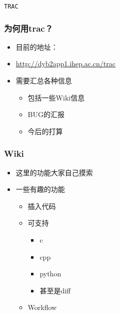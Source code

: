 
\begin{frame}
    \begin{center}
        \LARGE \tt{TRAC}
    \end{center}
\end{frame}

\begin{frame}
    \frametitle{为何用trac？}
    \begin{itemize}    
        \item 目前的地址：
        \item \url{http://dyb2app1.ihep.ac.cn/trac}
        \item 需要汇总各种信息
            \begin{itemize}
                \item 包括一些Wiki信息
                \item BUG的汇报
                \item 今后的打算
            \end{itemize}
    \end{itemize}
\end{frame}

\begin{frame}
    \frametitle{Wiki}
    \begin{itemize}    
        \item 这里的功能大家自己摸索
        \item 一些有趣的功能
            \begin{itemize}
                \item 插入代码
                \item 可支持
                    \begin{itemize}
                        \item c
                        \item cpp
                        \item python
                        \item 甚至是diff
                    \end{itemize}
                \item Workflow
            \end{itemize}
    \end{itemize}
\end{frame}

